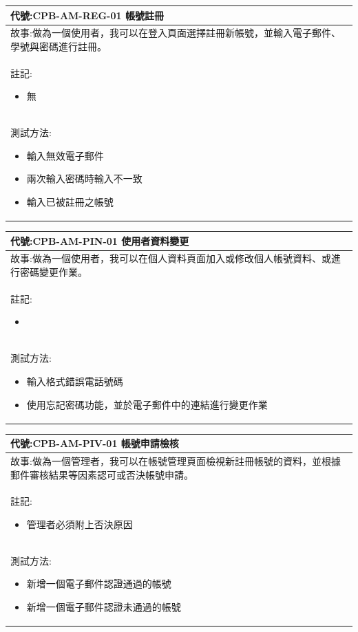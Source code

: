 \documentclass{article}
\begin{document}
\begin{table}
    \begin{tabular}{| m{13cm} |}
		\hline
	代號:CPB-AM-REG-01	帳號註冊	\\ \hline
	故事:做為一個使用者，我可以在登入頁面選擇註冊新帳號，並輸入電子郵件、學號與密碼進行註冊。		\\	\hline
	註記:	
	\begin{itemize}
		\item 無
	\end{itemize}		\\ \hline
	測試方法:	
	\begin{itemize}
		\item 輸入無效電子郵件
		\item 兩次輸入密碼時輸入不一致
		\item 輸入已被註冊之帳號
	\end{itemize}
	\\	\hline
    \end{tabular}
\end{table}

\begin{table}
    \begin{tabular}{| m{13cm} |}
		\hline
	代號:CPB-AM-PIN-01	使用者資料變更	\\ \hline
	故事:做為一個使用者，我可以在個人資料頁面加入或修改個人帳號資料、或進行密碼變更作業。		\\	\hline
	註記:	
	\begin{itemize}
		\item 
	\end{itemize}		\\ \hline
	測試方法:	
	\begin{itemize}
		\item 輸入格式錯誤電話號碼
		\item 使用忘記密碼功能，並於電子郵件中的連結進行變更作業
	\end{itemize}
	\\	\hline
    \end{tabular}
\end{table}

\begin{table}
    \begin{tabular}{| m{13cm} |}
		\hline
	代號:CPB-AM-PIV-01	帳號申請檢核	\\ \hline
	故事:做為一個管理者，我可以在帳號管理頁面檢視新註冊帳號的資料，並根據郵件審核結果等因素認可或否決帳號申請。		\\	\hline
	註記:
	\begin{itemize}
		\item 管理者必須附上否決原因
	\end{itemize}		\\ \hline
	測試方法:	
	\begin{itemize}
		\item 新增一個電子郵件認證通過的帳號
		\item 新增一個電子郵件認證未通過的帳號
	\end{itemize}
	\\	\hline
    \end{tabular}
\end{table}
\end{document}
